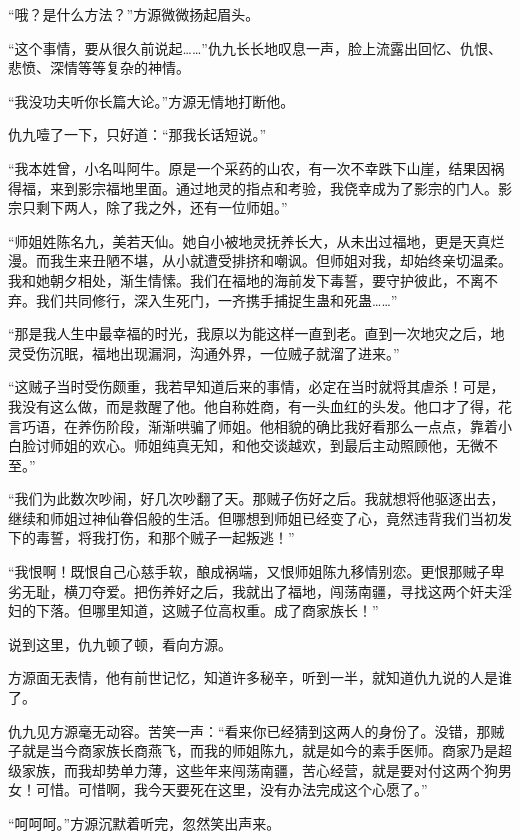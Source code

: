 
\begin{this_body}

“哦？是什么方法？”方源微微扬起眉头。

“这个事情，要从很久前说起……”仇九长长地叹息一声，脸上流露出回忆、仇恨、悲愤、深情等等复杂的神情。

“我没功夫听你长篇大论。”方源无情地打断他。

仇九噎了一下，只好道：“那我长话短说。”

“我本姓曾，小名叫阿牛。原是一个采药的山农，有一次不幸跌下山崖，结果因祸得福，来到影宗福地里面。通过地灵的指点和考验，我侥幸成为了影宗的门人。影宗只剩下两人，除了我之外，还有一位师姐。”

“师姐姓陈名九，美若天仙。她自小被地灵抚养长大，从未出过福地，更是天真烂漫。而我生来丑陋不堪，从小就遭受排挤和嘲讽。但师姐对我，却始终亲切温柔。我和她朝夕相处，渐生情愫。我们在福地的海前发下毒誓，要守护彼此，不离不弃。我们共同修行，深入生死门，一齐携手捕捉生蛊和死蛊……”

“那是我人生中最幸福的时光，我原以为能这样一直到老。直到一次地灾之后，地灵受伤沉眠，福地出现漏洞，沟通外界，一位贼子就溜了进来。”

“这贼子当时受伤颇重，我若早知道后来的事情，必定在当时就将其虐杀！可是，我没有这么做，而是救醒了他。他自称姓商，有一头血红的头发。他口才了得，花言巧语，在养伤阶段，渐渐哄骗了师姐。他相貌的确比我好看那么一点点，靠着小白脸讨师姐的欢心。师姐纯真无知，和他交谈越欢，到最后主动照顾他，无微不至。”

“我们为此数次吵闹，好几次吵翻了天。那贼子伤好之后。我就想将他驱逐出去，继续和师姐过神仙眷侣般的生活。但哪想到师姐已经变了心，竟然违背我们当初发下的毒誓，将我打伤，和那个贼子一起叛逃！”

“我恨啊！既恨自己心慈手软，酿成祸端，又恨师姐陈九移情别恋。更恨那贼子卑劣无耻，横刀夺爱。把伤养好之后，我就出了福地，闯荡南疆，寻找这两个奸夫淫妇的下落。但哪里知道，这贼子位高权重。成了商家族长！”

说到这里，仇九顿了顿，看向方源。

方源面无表情，他有前世记忆，知道许多秘辛，听到一半，就知道仇九说的人是谁了。

仇九见方源毫无动容。苦笑一声：“看来你已经猜到这两人的身份了。没错，那贼子就是当今商家族长商燕飞，而我的师姐陈九，就是如今的素手医师。商家乃是超级家族，而我却势单力薄，这些年来闯荡南疆，苦心经营，就是要对付这两个狗男女！可惜。可惜啊，我今天要死在这里，没有办法完成这个心愿了。”

“呵呵呵。”方源沉默着听完，忽然笑出声来。


\end{this_body}
